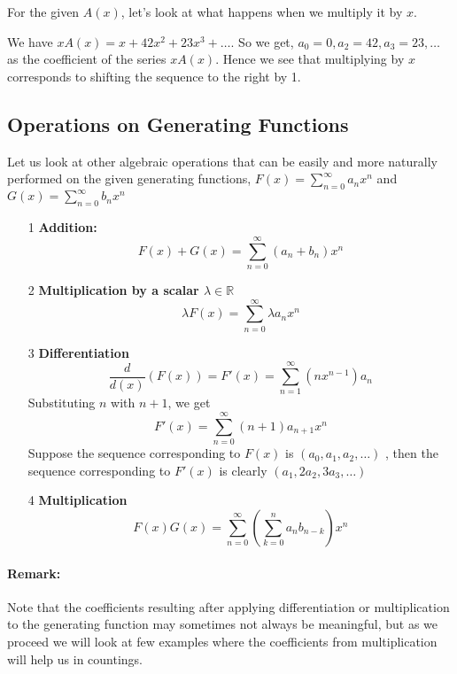 \noindent For the given $A(x)$, let's look at what happens when we multiply it by $x$.

We have $xA(x)=x+42x^2+23x^3+\dots$.
So we get, $a_0=0, a_2=42, a_3=23, \dots$ as the coefficient of the series $xA(x)$.
Hence we see that multiplying by $x$ corresponds to shifting the sequence to the right by 1. 

\subsection{Operations on Generating Functions}
\noindent Let us look at other algebraic operations that can be easily and more naturally performed on the given generating functions, $F(x)=\sum_{n=0}^{\infty}a_nx^n$ and $G(x)=\sum_{n=0}^{\infty}b_nx^n$ 
\begin{itemize}
    \item[1] \textbf{Addition:} $$F(x)+G(x)=\sum_{n=0}^{\infty}(a_n+b_n)x^n$$
    \item[2] \textbf{Multiplication by a scalar $\lambda \in \mathbb{R}$} $$\lambda F(x)=\sum_{n=0}^{\infty}\lambda a_nx^n$$
    \item[3] \textbf{Differentiation } $$\frac{d}{d(x)}(F(x))= F'(x)=\sum_{n=1}^{\infty}(nx^{n-1})a_n$$
    Substituting $n$ with $n+1$, we get $$F'(x)=\sum_{n=0}^{\infty}(n+1)a_{n+1}x^n$$
   Suppose the sequence corresponding to  $F(x)$ is $(a_0,a_1,a_2,\dots)$ , then the sequence corresponding to  $F'(x)$ is clearly $(a_1,2a_2,3a_3,\dots)$
   \item[4] \textbf{Multiplication}
   $$F(x)G(x)=\sum_{n=0}^{\infty}(\sum_{k=0}^n a_nb_{n-k})x^n$$
\end{itemize}
\paragraph{Remark:} Note that the coefficients resulting after applying differentiation or multiplication to the generating function may sometimes not always be meaningful, but as we proceed we will look at few examples where the coefficients from multiplication will help us in countings.
